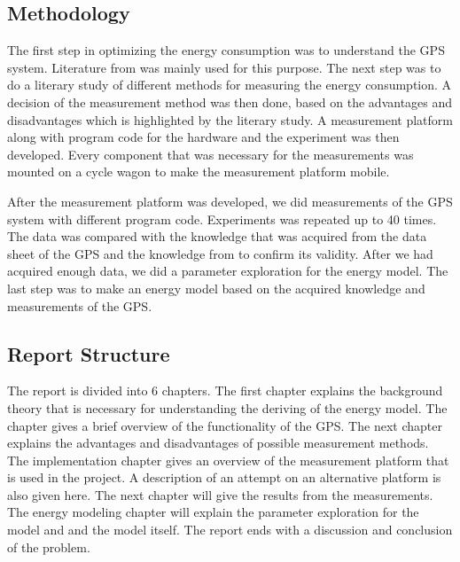 \subsection{Methodology}


The first step in optimizing the energy consumption was to understand the GPS system. Literature from  \cite{GPS} was mainly used for this purpose. The next step was to do a literary study of different methods for measuring the energy consumption. 
A decision of the measurement method was then done, based on the advantages and disadvantages which is highlighted by the literary study. A measurement platform along with program code for the hardware and the experiment was then developed. Every component that was necessary for the measurements was mounted on a cycle wagon to make the measurement platform mobile. 

After the measurement platform was developed, we did measurements of the GPS system with different program code. Experiments was repeated up to 40 times. The data was compared with the knowledge that was acquired from the data sheet of the GPS and the knowledge from \cite{GPS} to confirm its validity. After we had acquired enough data, we did a parameter exploration for the energy model. The last step was to make an energy model based on the acquired knowledge and measurements of the GPS. 



\subsection{Report Structure}

The report is divided into 6 chapters. The first chapter explains the background theory that is necessary for understanding the deriving of the energy model. The chapter gives a brief overview of the functionality of the GPS. The next chapter explains the advantages and disadvantages of possible measurement methods. The implementation chapter gives an overview of the measurement platform that is used in the project. A description of an attempt on an alternative platform is also given here. The next chapter will give the results from the measurements. The energy modeling chapter will explain the parameter exploration for the model and and the model itself. The report ends with a discussion and conclusion of the problem. 


\newpage